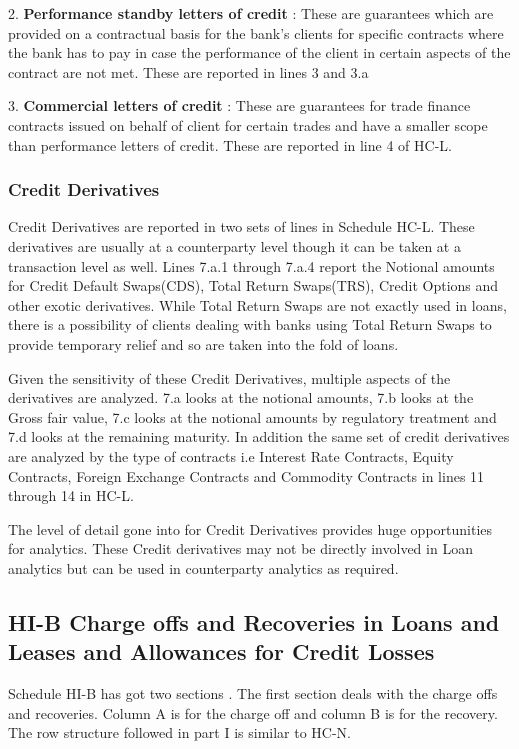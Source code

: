 \documentclass[conference]{IEEEtran}
\begin{document}
       2. \textbf{Performance standby letters of credit} : These are guarantees which are provided on a contractual basis for the bank's clients for specific contracts where the bank has to pay in case the performance of the client in certain aspects of the contract are not met. These are reported in lines 3 and 3.a
       
       3. \textbf{Commercial letters of credit} : These are guarantees for trade finance contracts issued on behalf of client for certain trades and have a smaller scope than performance letters of credit. These are reported in line 4 of HC-L.
       
       \subsubsection{Credit Derivatives}
       Credit Derivatives are reported in two sets of lines in Schedule HC-L. These derivatives are usually at a counterparty level though it can be taken at a transaction level as well. Lines 7.a.1 through 7.a.4 report the Notional amounts for Credit Default Swaps(CDS), Total Return Swaps(TRS), Credit Options and other exotic derivatives. While Total Return Swaps are not exactly used in loans, there is a possibility of clients dealing with banks using Total Return Swaps to provide temporary relief and so are taken into the fold of loans. 
       
       Given the sensitivity of these Credit Derivatives, multiple aspects of the derivatives are analyzed. 7.a looks at the notional amounts, 7.b looks at the Gross fair value, 7.c looks at the notional amounts by regulatory treatment and 7.d looks at the remaining maturity. In addition the same set of credit derivatives are analyzed by the type of contracts i.e Interest Rate Contracts, Equity Contracts, Foreign Exchange Contracts and Commodity Contracts in lines 11 through 14 in HC-L.
       
       The level of detail gone into for Credit Derivatives provides huge opportunities for analytics. These Credit derivatives may not be directly involved in Loan analytics but can be used in counterparty analytics as required.
    
    \subsection{HI-B Charge offs and Recoveries in Loans and Leases and Allowances for Credit Losses}
    Schedule HI-B has got two sections . The first section deals with the charge offs and recoveries. Column A is for the charge off and column B is for the recovery. The row structure followed in part I is similar to HC-N. 
    
\end{document}
